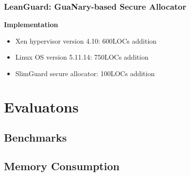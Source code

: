 \documentclass[xcolor=table,bigger,unknownkeysallowed]{beamer}
\begin{document}
\begin{frame}
	\frametitle{LeanGuard: GuaNary-based Secure Allocator} 
	\textbf{Implementation}\\
	\vspace*{.5cm}
	\begin{itemize}
		\item Xen hypervisor version 4.10: 600LOCs addition
		\pause
		\item Linux OS version 5.11.14: 750LOCs addition
		\pause
		\item SlimGuard secure allocator: 100LOCs addition
	\end{itemize}
\end{frame}
\section{Evaluatons}
\subsection{Benchmarks}
\subsection{Memory Consumption}
\end{document}
